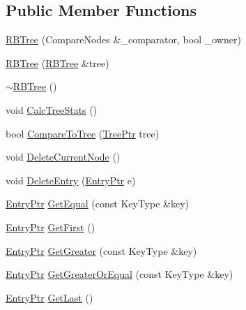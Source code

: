 \subsection*{Public Member Functions}
\begin{DoxyCompactItemize}
\item 
\hyperlink{class_k_k_b_1_1_r_b_tree_a8c31cb7a1a97513dcbe717696359be09}{R\+B\+Tree} (Compare\+Nodes \&\+\_\+comparator, bool \+\_\+owner)
\item 
\hyperlink{class_k_k_b_1_1_r_b_tree_a4eac00e8d6d4c300a912a840ff04720b}{R\+B\+Tree} (\hyperlink{class_k_k_b_1_1_r_b_tree}{R\+B\+Tree} \&tree)
\item 
\hyperlink{class_k_k_b_1_1_r_b_tree_a0d0922dcd2232caf29223e5b9c5e4174}{$\sim$\+R\+B\+Tree} ()
\item 
void \hyperlink{class_k_k_b_1_1_r_b_tree_a9cbd35932923709b3b8b9d9df8634379}{Calc\+Tree\+Stats} ()
\item 
bool \hyperlink{class_k_k_b_1_1_r_b_tree_a14b77873f1b45db066bd393e9811641d}{Compare\+To\+Tree} (\hyperlink{class_k_k_b_1_1_r_b_tree_a657196027b6c9741e01cb4563b7bf28b}{Tree\+Ptr} tree)
\item 
void \hyperlink{class_k_k_b_1_1_r_b_tree_a925c62ec939b5d7b90959a3af8b42d28}{Delete\+Current\+Node} ()
\item 
void \hyperlink{class_k_k_b_1_1_r_b_tree_ae031a4b6803af6a9a02b5218481c4f46}{Delete\+Entry} (\hyperlink{class_k_k_b_1_1_r_b_tree_a0e7710d8357973338c99b99034b17f33}{Entry\+Ptr} e)
\item 
\hyperlink{class_k_k_b_1_1_r_b_tree_a0e7710d8357973338c99b99034b17f33}{Entry\+Ptr} \hyperlink{class_k_k_b_1_1_r_b_tree_a9f157c30cce4885b8abac7f4981321e9}{Get\+Equal} (const Key\+Type \&key)
\item 
\hyperlink{class_k_k_b_1_1_r_b_tree_a0e7710d8357973338c99b99034b17f33}{Entry\+Ptr} \hyperlink{class_k_k_b_1_1_r_b_tree_a66b152371fdfc103f41a830625a04a53}{Get\+First} ()
\item 
\hyperlink{class_k_k_b_1_1_r_b_tree_a0e7710d8357973338c99b99034b17f33}{Entry\+Ptr} \hyperlink{class_k_k_b_1_1_r_b_tree_aed0e37c807c74bda44fd9ad7fe92922a}{Get\+Greater} (const Key\+Type \&key)
\item 
\hyperlink{class_k_k_b_1_1_r_b_tree_a0e7710d8357973338c99b99034b17f33}{Entry\+Ptr} \hyperlink{class_k_k_b_1_1_r_b_tree_ac9365b1ea43d7306c8231ee200758d3e}{Get\+Greater\+Or\+Equal} (const Key\+Type \&key)
\item 
\hyperlink{class_k_k_b_1_1_r_b_tree_a0e7710d8357973338c99b99034b17f33}{Entry\+Ptr} \hyperlink{class_k_k_b_1_1_r_b_tree_aea42a72543e2efeec63f717b14673ff8}{Get\+Last} ()

\end{DoxyCompactItemize}
